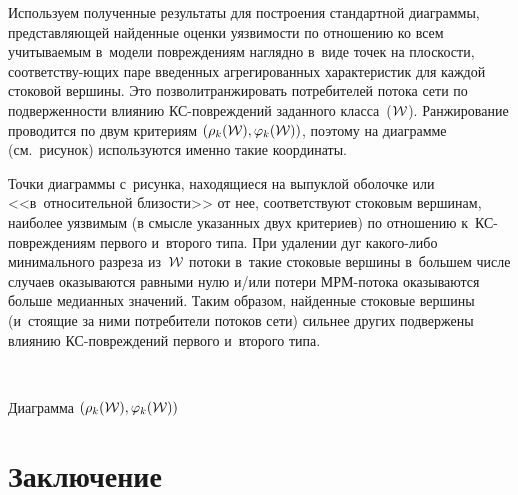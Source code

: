 \begin{multicols}{2}
Используем полученные результаты для по\-стро\-ения стандартной диаграммы, 
пред\-став\-ля\-ющей найден\-ные оценки уяз\-ви\-мости по отношению ко всем 
учитываемым в~модели повреждениям на\-глядно в~виде точек на плос\-кости, 
со\-от\-вет\-ст\-ву-\linebreak ющих паре введенных агрегированных характеристик
 для каж\-дой 
стоковой вершины. Это позволит\linebreak ранжировать по\-тре\-би\-те\-лей потока сети по 
подверженности влиянию КС-по\-вреж\-де\-ний заданного класса~(${\cal W}$). 
Ранжирование проводится по двум критериям  $(\rho_k({\cal W}),  \varphi_k({\cal W}))$, 
поэтому на диа\-грам\-ме (см.\ рисунок) используются именно такие ко\-ор\-ди\-наты.



Точки диаграммы с~рисунка, находящиеся на выпуклой оболочке 
или <<в~относительной бли\-зости>> от нее, соответствуют стоковым вершинам, 
наиболее уязвимым (в смысле указанных двух критериев) по отношению 
к~КС-по\-вреж\-де\-ни\-ям первого и~второго типа. При удалении дуг ка\-ко\-го-ли\-бо 
минимального разреза из~${\cal W}$ потоки в~такие стоковые вершины 
в~большем чис\-ле случаев оказываются равными нулю и/или потери МРМ-по\-то\-ка 
оказываются больше медианных значений. Таким образом, найденные стоковые вершины 
(и~стоящие за ними потребители потоков сети) сильнее других подвержены влиянию 
КС-по\-вреж\-де\-ний первого и~второго типа. 

{\begin{center}  %
 \vspace*{12pt}
  \mbox{%
 \epsfxsize=78.698mm 
 }



\vspace*{6pt}


\noindent
{\small Диаграмма $(\rho_k({\cal W}),  \varphi_k({\cal W}))$}
\end{center}

}



\section{Заключение}

\vspace*{-10pt}


\end{multicols}
